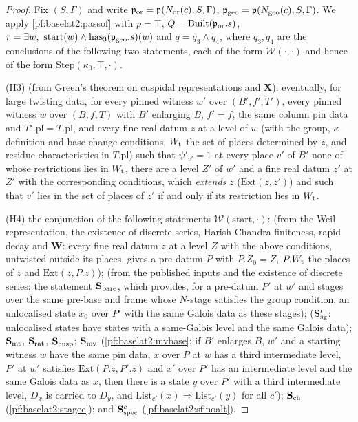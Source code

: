 \begin{proof}
Fix $(S,\Gamma)$ and write $\mathfrak{p}_{\mathrm{or}}=\mathfrak{p}(N_{\mathrm{or}}(c),S,\Gamma)$,
$\mathfrak{p}_{\mathrm{geo}}=\mathfrak{p}(N_{\mathrm{geo}}(c),S,\Gamma)$. We apply \cref{pf:baselat2:passof} with $p=\top$,
$Q=\mathrm{Built}(\mathfrak{p}_{\mathrm{or}}.s)$, $r=\exists w,\ \mathrm{start}(w)\wedge\mathrm{has}_3(\bltwop_{\mathrm{geo}}.s)(w)$
and $q=q_3\wedge q_4$, where $q_3,q_4$ are the conclusions of the following two statements, each of the
form $\mathcal{W}(\cdot,\cdot)$ and hence of the form $\mathrm{Step}(\kappa_0,\top,\cdot)$.

(H3)  (from Green's theorem on cuspidal
representations and $\mathbf{X}$): eventually, for large twisting data, for every pinned witness $w'$
over $(B',f',T')$, every pinned witness $w$ over $(B,f,T)$ with $B'$ enlarging $B$, $f'=f$, the same column
pin data and $T'.\mathrm{pl}=T.\mathrm{pl}$, and every fine real datum $z$ at a level of $w$ (with the group,
$\kappa$-definition and base-change conditions, $W_{\mathrm{t}}$ the set of places determined by $z$, and residue
characteristics in $T.\mathrm{pl}$) such that $\psi'_{v'}=1$ at every place $v'$ of $B'$ none of whose
restrictions lies in $W_{\mathrm{t}}$, there are a level $Z'$ of $w'$ and a fine real datum $z'$ at $Z'$ with the
corresponding conditions, which \emph{extends} $z$ ($\mathrm{Ext}(z,z')$) and such that $v'$ lies in the set
of places of $z'$ if and only if its restriction lies in $W_{\mathrm{t}}$.

(H4) the conjunction of the following statements $\mathcal{W}(\mathrm{start},\cdot)$:
 (from the Weil representation, the
existence of discrete series, Harish-Chandra finiteness, rapid decay and $\mathbf{W}$:
every fine real datum $z$ at a level $Z$ with the above conditions, untwisted outside its places, gives a
pre-datum $P$ with $P.Z_0=Z$, $P.W_{\mathrm{t}}$ the places of $z$ and $\mathrm{Ext}(z,P.z)$);
 (from the published inputs and the existence of
discrete series: the statement $\mathbf{S}_{\mathrm{bare}}$, which provides, for a pre-datum $P'$ at $w'$ and stages over
the same pre-base and frame whose $N$-stage satisfies the group condition, an unlocalised state $x_0$ over
$P'$ with the same Galois data as these stages);  ($\mathbf{S}_{\mathrm{sg}}'$:
unlocalised states have states with a same-Galois level and the same Galois data); $\mathbf{S}_{\mathrm{mt}}$,
$\mathbf{S}_{\mathrm{rat}}$, $\mathbf{S}_{\mathrm{cusp}}$; $\mathbf{S}_{\mathrm{mv}}$ (\cref{pf:baselat2:mvbase}: if $B'$
enlarges $B$, $w'$ and a starting witness $w$ have the same pin data, $x$ over $P$ at $w$ has a third
intermediate level, $P'$ at $w'$ satisfies $\mathrm{Ext}(P.z,P'.z)$ and $x'$ over $P'$ has an intermediate level and
the same Galois data as $x$, then there is a state $y$ over $P'$ with a third intermediate level, $D_x$ is
carried to $D_y$, and $\mathrm{List}_{c'}(x)\Rightarrow\mathrm{List}_{c'}(y)$ for all $c'$);
$\mathbf{S}_{\mathrm{ch}}$ (\cref{pf:baselat2:stagec}); and $\mathbf{S}_{\mathrm{spec}}^{c}$ (\cref{pf:baselat2:sfinoalt}).


\end{proof}
